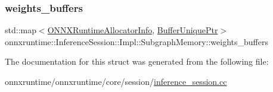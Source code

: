 \mbox{\label{structonnxruntime_1_1InferenceSession_1_1Impl_1_1SubgraphMemory_a96a959ef483da22b2ad74c5805f69f1d}} 
\subsubsection{\texorpdfstring{weights\+\_\+buffers}{weights\_buffers}}
{\footnotesize\ttfamily std\+::map$<$\mbox{\hyperlink{structONNXRuntimeAllocatorInfo}{O\+N\+N\+X\+Runtime\+Allocator\+Info}}, \mbox{\hyperlink{namespaceonnxruntime_acd830c816d6e0699b671f8ba79bb48f9}{Buffer\+Unique\+Ptr}}$>$ onnxruntime\+::\+Inference\+Session\+::\+Impl\+::\+Subgraph\+Memory\+::weights\+\_\+buffers}



The documentation for this struct was generated from the following file\+:\begin{DoxyCompactItemize}
\item 
onnxruntime/onnxruntime/core/session/\mbox{\hyperlink{inference__session_8cc}{inference\+\_\+session.\+cc}}\end{DoxyCompactItemize}
